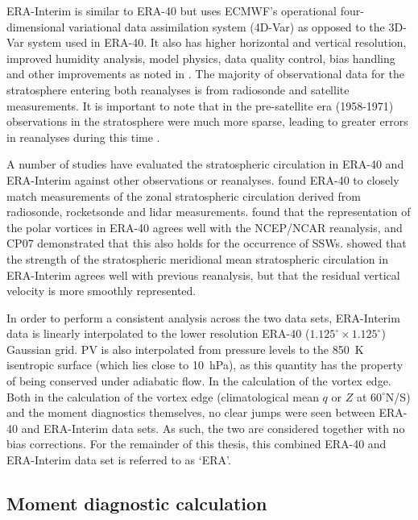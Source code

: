 ERA-Interim is similar to ERA-40 but uses ECMWF’s operational four-dimensional
variational data assimilation system (4D-Var) as opposed to the 3D-Var system
used in ERA-40. It also has higher horizontal and vertical resolution, improved
humidity analysis, model physics, data quality control, bias handling and other
improvements as noted in \citet{Simmons2007}. The majority of observational data
for the stratosphere entering both reanalyses is from radiosonde and satellite
measurements. It is important to note that in the pre-satellite era (1958-1971)
observations in the stratosphere were much more sparse, leading to greater
errors in reanalyses during this time \citep{Uppala2005}. 

A number of studies have evaluated the stratospheric circulation in ERA-40 and
ERA-Interim against other observations or reanalyses. \citet{Randel2004} found
ERA-40 to closely match measurements of the zonal stratospheric circulation
derived from radiosonde, rocketsonde and lidar
measurements. \citet{Karpetchko2005} found that the representation of the polar
vortices in ERA-40 agrees well with the NCEP/NCAR reanalysis, and CP07
demonstrated that this also holds for the occurrence of
SSWs. \citet{Seviour2012} showed that the strength of the stratospheric
meridional mean stratospheric circulation in ERA-Interim agrees well with
previous reanalysis, but that the residual vertical velocity is more smoothly
represented.

In order to perform a consistent analysis across the two data sets, ERA-Interim
data is linearly interpolated to the lower resolution ERA-40
($1.125^{\circ} \times 1.125^{\circ}$) Gaussian grid. PV is also interpolated
from pressure levels to the 850~K isentropic surface (which lies close to
10~hPa), as this quantity has the property of being conserved under adiabatic
flow. In the calculation of the vortex edge. Both in the calculation of the
vortex edge (climatological mean $q$ or $Z$ at $60^{\circ}$N/S) and the moment
diagnostics themselves, no clear jumps were seen between ERA-40 and ERA-Interim
data sets. As such, the two are considered together with no bias
corrections. For the remainder of this thesis, this combined ERA-40 and
ERA-Interim data set is referred to as `ERA'. 


\subsection{Moment diagnostic calculation}
\label{sec:vort-geom-calc}

